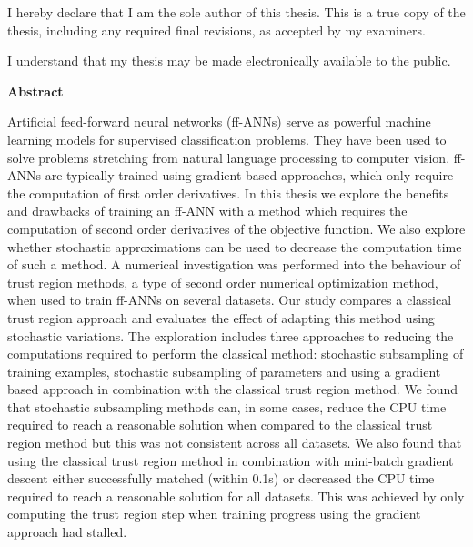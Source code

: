 \cleardoublepage %
 


  \noindent
I hereby declare that I am the sole author of this thesis. This is a true copy of the thesis, including any required final revisions, as accepted by my examiners.

  \bigskip
  
  \noindent
I understand that my thesis may be made electronically available to the public.

\cleardoublepage


\begin{center}\textbf{Abstract}\end{center}

Artificial feed-forward neural networks (ff-ANNs) serve as powerful machine learning models for supervised classification problems. They have been used to solve problems stretching from natural language processing to computer vision. ff-ANNs are typically trained using gradient based approaches, which only require the computation of first order derivatives. In this thesis we explore the benefits and drawbacks of training an ff-ANN with a method which requires the computation of second order derivatives of the objective function. We also explore whether stochastic approximations can be used to decrease the computation time of such a method. A numerical investigation was performed into the behaviour of trust region methods, a type of second order numerical optimization method, when used to train ff-ANNs on several datasets. Our study compares a classical trust region approach and evaluates the effect of adapting this method using stochastic variations. The exploration includes three approaches to reducing the computations required to perform the classical method: stochastic subsampling of training examples, stochastic subsampling of parameters and using a gradient based approach in combination with the classical trust region method. We found that stochastic subsampling methods can, in some cases, reduce the CPU time required to reach a reasonable solution when compared to the classical trust region method but this was not consistent across all datasets. We also found that using the classical trust region method in combination with mini-batch gradient descent either successfully matched (within 0.1s) or decreased the CPU time required to reach a reasonable solution for all datasets. This was achieved by only computing the trust region step when training progress using the gradient approach had stalled. 


